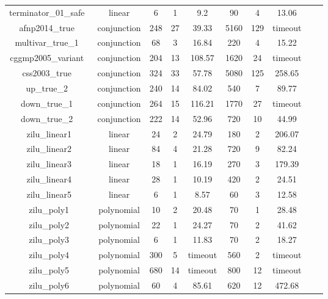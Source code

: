 \begin{table}[t]
\begin{tabular}{l c | c c c | c c c | c c }
\multicolumn{1}{|c|}{terminator\_01\_safe~\cite{beyer:SVCOMP:2013}}         	&linear 		&6 &1 &9.2  			&90  &4  &13.06  & &  \\
\multicolumn{1}{|c|}{afnp2014\_true~\cite{Dirk:SVCOMP:2016}}         			&conjunction	&248 &27 &39.33			&5160 &129 &timeout  		& &  \\
\multicolumn{1}{|c|}{multivar\_true\_1~\cite{Dirk:SVCOMP:2016}}         		&conjunction 	&68 &3 &16.84  			&220 &4   &15.22  			& &  \\
\multicolumn{1}{|c|}{cggmp2005\_variant~\cite{Dirk:SVCOMP:2016}}   				&conjunction 	&204 &13 &108.57		&1620 &24 &timeout  		& &  \\
\multicolumn{1}{|c|}{css2003\_true~\cite{Dirk:SVCOMP:2016}}         			&conjunction 	&324 &33 &57.78			&5080 &125 &258.65  		& &  \\
\multicolumn{1}{|c|}{up\_true\_2~\cite{Dirk:SVCOMP:2016}}         				&conjunction 	&240 &14 &84.02  		&540 &7   &89.77  			& &  \\
\multicolumn{1}{|c|}{down\_true\_1~\cite{Dirk:SVCOMP:2016}}         			&conjunction 	&264  &15 &116.21  		&1770  &27  &timeout  		& &  \\
\multicolumn{1}{|c|}{down\_true\_2~\cite{Dirk:SVCOMP:2016}}         			&conjunction 	&222 &14 &52.96  		&720 &10   &44.99  			& &  \\

\multicolumn{1}{|c|}{zilu\_linear1}         				&linear 		&24 &2 &24.79  			&180 &2   &206.07  			& &  \\
\multicolumn{1}{|c|}{zilu\_linear2}         				&linear 		&84 &4 &21.28  			&720  &9  &82.24  			& &  \\
\multicolumn{1}{|c|}{zilu\_linear3}         				&linear 		&18 &1 &16.19  			&270 &3  &179.39  			& &  \\
\multicolumn{1}{|c|}{zilu\_linear4}         				&linear 		&28 &1 &10.19  			&420 &2  &24.51  			& &  \\
\multicolumn{1}{|c|}{zilu\_linear5}         				&linear 		&6 &1 &8.57  			&60 &3   &12.58  			& &  \\

\multicolumn{1}{|c|}{zilu\_poly1}         					&polynomial 	&10 &2 &20.48			&70 &1 &28.48  				& &  \\
\multicolumn{1}{|c|}{zilu\_poly2}         					&polynomial 	&22  &1 &24.27  		&70   &2 &41.62  			& &  \\
\multicolumn{1}{|c|}{zilu\_poly3}         					&polynomial 	&6 &1 &11.83  			&70  &2  &18.27  			& &  \\
\multicolumn{1}{|c|}{zilu\_poly4}         					&polynomial 	&300 &5 &timeout  		&560  &2  &timeout 			& & \\
\multicolumn{1}{|c|}{zilu\_poly5}         					&polynomial 	&680 &14 &timeout  		&800  &12  &timeout  		& &  \\
\multicolumn{1}{|c|}{zilu\_poly6}         					&polynomial 	&60 &4 &85.61  			&620   &12 &472.68  		& &  \\


\end{tabular}
\end{table}
